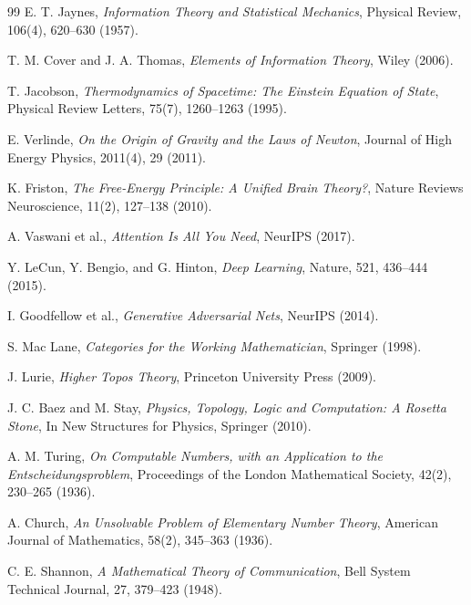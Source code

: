 \documentclass[11pt]{article}
\theoremstyle{definition}
\begin{document}
\begin{thebibliography}{99}
E. T. Jaynes,
\textit{Information Theory and Statistical Mechanics},
Physical Review, 106(4), 620--630 (1957).

T. M. Cover and J. A. Thomas,
\textit{Elements of Information Theory},
Wiley (2006).

T. Jacobson,
\textit{Thermodynamics of Spacetime: The Einstein Equation of State},
Physical Review Letters, 75(7), 1260--1263 (1995).

E. Verlinde,
\textit{On the Origin of Gravity and the Laws of Newton},
Journal of High Energy Physics, 2011(4), 29 (2011).

K. Friston,
\textit{The Free-Energy Principle: A Unified Brain Theory?},
Nature Reviews Neuroscience, 11(2), 127--138 (2010).

A. Vaswani et al.,
\textit{Attention Is All You Need},
NeurIPS (2017).

Y. LeCun, Y. Bengio, and G. Hinton,
\textit{Deep Learning},
Nature, 521, 436--444 (2015).

I. Goodfellow et al.,
\textit{Generative Adversarial Nets},
NeurIPS (2014).

S. Mac Lane,
\textit{Categories for the Working Mathematician},
Springer (1998).

J. Lurie,
\textit{Higher Topos Theory},
Princeton University Press (2009).

J. C. Baez and M. Stay,
\textit{Physics, Topology, Logic and Computation: A Rosetta Stone},
In New Structures for Physics, Springer (2010).

A. M. Turing,
\textit{On Computable Numbers, with an Application to the
Entscheidungsproblem},
Proceedings of the London Mathematical Society, 42(2), 230--265 (1936).

A. Church,
\textit{An Unsolvable Problem of Elementary Number Theory},
American Journal of Mathematics, 58(2), 345--363 (1936).

C. E. Shannon,
\textit{A Mathematical Theory of Communication},
Bell System Technical Journal, 27, 379--423 (1948).

\end{thebibliography}
\end{document}
